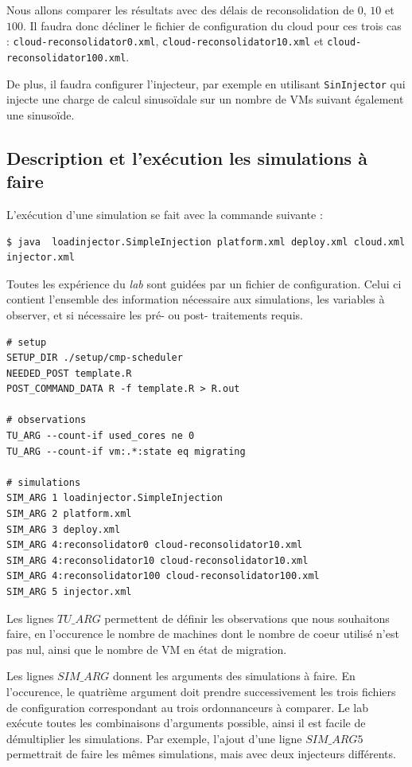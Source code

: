 \documentclass[parallelisme]{compas2017}
\begin{document}
Nous allons comparer les résultats avec des délais de reconsolidation de $0$, 
$10$ et $100$. Il faudra donc décliner le fichier de configuration du cloud 
pour ces trois cas : \texttt{cloud-reconsolidator0.xml}, 
\texttt{cloud-reconsolidator10.xml} et \texttt{cloud-reconsolidator100.xml}. 

De plus, il faudra configurer l'injecteur, par exemple en utilisant 
\texttt{SinInjector} qui injecte une charge de calcul sinusoïdale sur un nombre 
de VMs suivant également une sinusoïde.


\subsection{Description et l'exécution les simulations à faire}

L'exécution d'une simulation se fait avec la commande suivante : 
\begin{verbatim}
$ java  loadinjector.SimpleInjection platform.xml deploy.xml cloud.xml
injector.xml
\end{verbatim}

Toutes les expérience du \emph{lab} sont guidées par un fichier de 
configuration. Celui ci contient l'ensemble des information nécessaire aux 
simulations, les variables à observer, et si nécessaire les pré- ou post- 
traitements requis. 

\begin{lstlisting}
# setup
SETUP_DIR ./setup/cmp-scheduler
NEEDED_POST template.R
POST_COMMAND_DATA R -f template.R > R.out

# observations
TU_ARG --count-if used_cores ne 0
TU_ARG --count-if vm:.*:state eq migrating

# simulations
SIM_ARG 1 loadinjector.SimpleInjection
SIM_ARG 2 platform.xml 
SIM_ARG 3 deploy.xml
SIM_ARG 4:reconsolidator0 cloud-reconsolidator10.xml
SIM_ARG 4:reconsolidator10 cloud-reconsolidator10.xml 
SIM_ARG 4:reconsolidator100 cloud-reconsolidator100.xml
SIM_ARG 5 injector.xml
\end{lstlisting}

Les lignes \texttt{$TU\_ARG$} permettent de définir les observations que nous 
souhaitons faire, en l'occurence le nombre de machines dont le nombre de coeur 
utilisé n'est pas nul, ainsi que le nombre de VM en état de migration.

Les lignes \texttt{$SIM\_ARG$} donnent les arguments des simulations à faire. 
En l'occurence, le quatrième argument doit prendre successivement les trois 
fichiers de configuration correspondant au trois ordonnanceurs à comparer. 
Le lab exécute toutes les combinaisons d'arguments possible, ainsi il est 
facile de démultiplier les simulations. Par exemple, l'ajout d'une ligne 
\texttt{$SIM\_ARG 5$} permettrait de faire les mêmes simulations, mais avec 
deux injecteurs différents.
\end{document}

